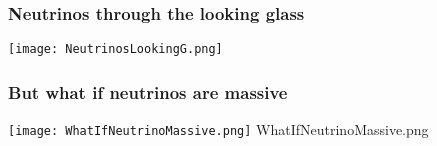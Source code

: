 %
%


\begin{frame}
\frametitle{Neutrinos through the looking glass}
\texttt{[image: NeutrinosLookingG.png]}
\end{frame}

\begin{frame}
\frametitle{But what if neutrinos are massive}
\texttt{[image: WhatIfNeutrinoMassive.png]}
WhatIfNeutrinoMassive.png

\end{frame}




